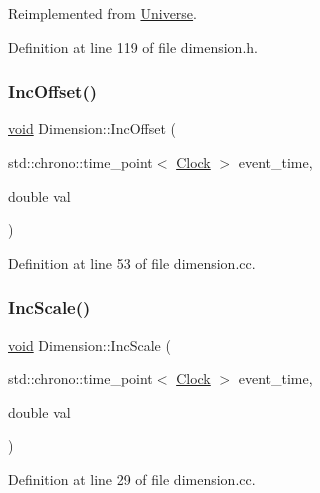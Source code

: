 Reimplemented from \mbox{\hyperlink{class_universe_a645299738e6b798a037f2a15a2e7cf4d}{Universe}}.



Definition at line 119 of file dimension.\+h.

\mbox{\label{class_dimension_aaf18cc220562b30f9e7aee92f16cc08e}} 
\subsubsection{\texorpdfstring{Inc\+Offset()}{IncOffset()}}
{\footnotesize\ttfamily \mbox{\hyperlink{glad_8h_a950fc91edb4504f62f1c577bf4727c29}{void}} Dimension\+::\+Inc\+Offset (\begin{DoxyParamCaption}\item[{std\+::chrono\+::time\+\_\+point$<$ \mbox{\hyperlink{universe_8h_a0ef8d951d1ca5ab3cfaf7ab4c7a6fd80}{Clock}} $>$}]{event\+\_\+time,  }\item[{double}]{val }\end{DoxyParamCaption})}



Definition at line 53 of file dimension.\+cc.

\mbox{\label{class_dimension_aa323eaa2c592e498d48e0739009ec313}} 
\subsubsection{\texorpdfstring{Inc\+Scale()}{IncScale()}}
{\footnotesize\ttfamily \mbox{\hyperlink{glad_8h_a950fc91edb4504f62f1c577bf4727c29}{void}} Dimension\+::\+Inc\+Scale (\begin{DoxyParamCaption}\item[{std\+::chrono\+::time\+\_\+point$<$ \mbox{\hyperlink{universe_8h_a0ef8d951d1ca5ab3cfaf7ab4c7a6fd80}{Clock}} $>$}]{event\+\_\+time,  }\item[{double}]{val }\end{DoxyParamCaption})}



Definition at line 29 of file dimension.\+cc.

\mbox{\label{class_dimension_afc61c6d6d68ec0ed461458d504fec16f}} 
